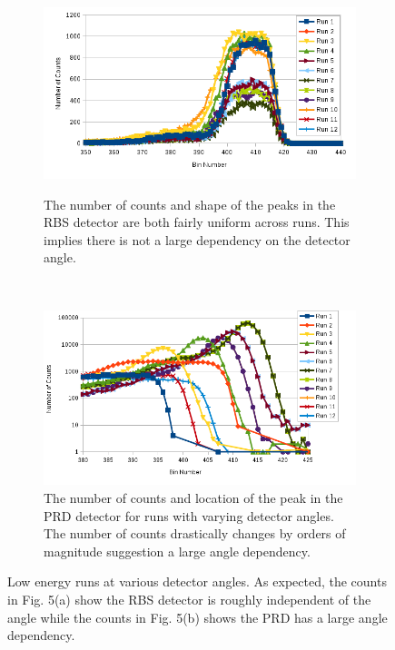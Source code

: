 \documentclass[10pt]{IEEEtran}
\begin{document}
\begin{figure}[!hbt]
	\begin{center}
    \begin{subfigure}[!hbt]{0.49\textwidth}
    	    \\
        \includegraphics[width=\textwidth]{lowrbs.png}
        \caption{The number of counts and shape of the peaks in the RBS detector are both fairly uniform across runs. This implies there is not a large dependency on the detector angle.}
        \label{fig:lowrbs}
    \end{subfigure}\hfill
    ~ %
    \begin{subfigure}[!hbt]{0.49\textwidth}
        \includegraphics[width=\textwidth]{loglowprd.png}
        \caption{The number of counts and location of the peak in the PRD detector for runs with varying detector angles. The number of counts drastically changes by orders of magnitude suggestion a large angle dependency.}
        \label{fig:lowprd}
    \end{subfigure}
    \caption{Low energy runs at various detector angles. As expected, the counts in Fig. 5(a) show the RBS detector is roughly independent of the angle while the counts in Fig. 5(b) shows the PRD has a large angle dependency.}
    \label{fig:lowenergy}
    \end{center}
\end{figure}
\end{document}
